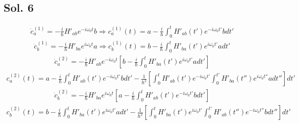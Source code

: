 \subsection*{Sol. 6}
\begin{align*}
    \dot c_a^{(1)} = -\frac{i}{\hbar}H'_{ab}e^{-i\omega_0 t}b \Rightarrow
    c_a^{(1)}(t) =
    a-\frac{i}{\hbar}
    \int_{0}^t H'_{ab}(t')e^{-i\omega_0 t'}bdt'
\end{align*}
\begin{align*}
    \dot c_b^{(1)} = -\frac{i}{\hbar}H'_{ba}e^{i\omega_0 t}a \Rightarrow
    c_b^{(1)}(t) =
    b-\frac{i}{\hbar}
    \int_{0}^t H'_{ba}(t')e^{i\omega_0 t'}adt'
\end{align*}
\begin{align*}
    \dot c_a^{(2)} = -\frac{i}{\hbar}H'_{ab}
    e^{-i\omega_0 t}
    \left[
        b-\frac{i}{\hbar}
        \int_{0}^t H'_{ba}(t')e^{i\omega_0 t'}adt'
        \right]
\end{align*}
\begin{align*}
    c_a^{(2)}(t) =
    a
    -\frac{i}{\hbar}
    \int_0^{t}H'_{ab}(t')
    e^{-i\omega_0 t'}bdt'
    -\frac{1}{\hbar^2}
    \left[
        \int_{0}^{t}
        H'_{ab}(t')
        e^{-i\omega_0 t'}
        \int_{0}^{t'} H'_{ba}(t'')e^{i\omega_0 t''}adt''
        \right]dt'
\end{align*}
\begin{align*}
    \dot c_b^{(2)} = -\frac{i}{\hbar}H'_{ba}
    e^{i\omega_0 t}
    \left[
        a-\frac{i}{\hbar}
        \int_{0}^t H'_{ab}(t')e^{-i\omega_0 t'}bdt'
        \right]
\end{align*}
\begin{align*}
    c_b^{(2)}(t) =
    b
    -\frac{i}{\hbar}
    \int_0^{t}H'_{ba}(t')
    e^{i\omega_0 t'}adt'
    -\frac{1}{\hbar^2}
    \left[
        \int_{0}^{t}
        H'_{ba}(t')
        e^{i\omega_0 t'}
        \int_{0}^{t'} H'_{ab}(t'')e^{-i\omega_0 t''}bdt''
        \right]dt'
\end{align*}
